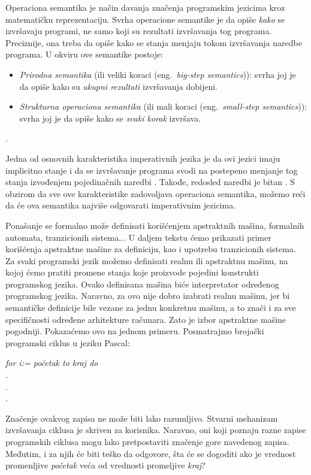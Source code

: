 \documentclass[a4paper]{article}
\begin{document}
{\qquad Operaciona semantika je način davanja značenja programskim jezicima kroz matematičku reprezentaciju. Svrha operacione semantike je da opiše \textit{kako} se izvršavaju programi, ne samo koji su rezultati izvršavanja tog programa. Preciznije, ona treba da opiše kako se stanja menjaju tokom izvršavanja naredbe programa. U okviru ove semantike postoje:
\begin{itemize}
	\item \textit{Prirodna semantika} (ili veliki koraci (eng.~{\em big-step semantics})): svrha joj je da opiše kako su \textit{ukupni rezultati} izvršavanja dobijeni.
	\item \textit{Strukturna operaciona semantika} (ili mali koraci (eng.~{\em small-step semantics})): svrha joj je da opiše kako se \textit{svaki korak} izvršava.
\end{itemize} \cite{wiley}.

Jedna od osnovnih karakteristika imperativnih jezika je da ovi jezici imaju implicitno stanje i da se izvršavanje programa svodi na postepeno menjanje tog stanja izvođenjem pojedinačnih naredbi \cite{milena2}. Takođe, redosled naredbi je bitan \cite{milena2}. S obzirom da sve ove karakteristike zadovoljava operaciona semantika, možemo reći da će ova semantika najviše odgovarati imperativnim jezicima. 


Ponašanje se formalno može definisati korišćenjem apstraktnih mašina, formalnih automata, tranzicionih sistema... U daljem tekstu ćemo prikazati primer korišćenja apstraktne mašine za definiciju, kao i upotrebu tranzicionih sistema.\\

Za svaki programski jezik možemo definisati realnu ili apstraktnu mašinu, na kojoj ćemo pratiti promene stanja koje proizvode pojedini konstrukti programskog jezika. Ovako definisana mašina biće interpretator određenog programskog jezika. Naravno, za ovo nije dobro izabrati realnu mašinu, jer bi semantičke definicije bile vezane za jednu konkretnu mašinu, a to znači i za sve specifičnosti određene arhitekture računara. Zato je izbor apstraktne mašine pogodniji. Pokazaćemo ovo na jednom primeru. Posmatrajmo brojački programski ciklus u jeziku Pascal:\\

\begin{center}\textit{for i:= početak to kraj do}
\\.
\\.
\\.
\end{center}
\hfill \break
Značenje ovakvog zapisa ne može biti lako razumljivo. Stvarni mehanizam izvršavanja ciklusa je skriven za korisnika. Naravno, oni koji poznaju razne zapise programskih ciklusa mogu lako pretpostaviti značenje gore navedenog zapisa. Međutim, i za njih će biti teško da odgovore, šta će se dogoditi ako je vrednost promenljive \textit{početak} veća od vrednosti promeljive \textit{kraj}?


}
\end{document}
